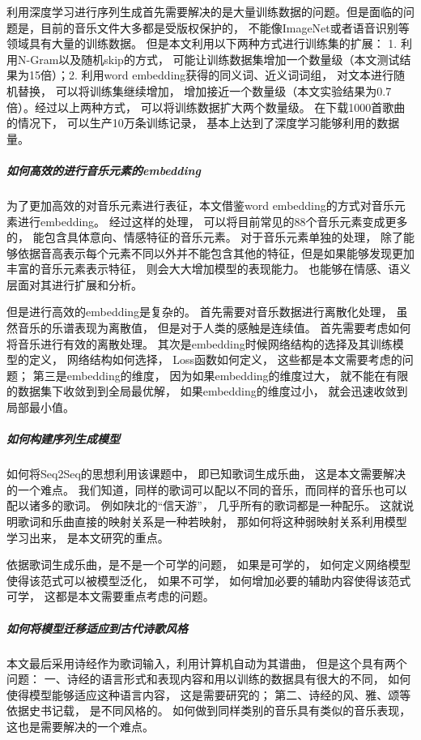 利用深度学习进行序列生成首先需要解决的是大量训练数据的问题。但是面临的问题是，目前的音乐文件大多都是受版权保护的， 不能像ImageNet或者语音识别等领域具有大量的训练数据。 但是本文利用以下两种方式进行训练集的扩展： 1. 利用N-Gram以及随机skip的方式， 可能让训练数据集增加一个数量级（本文测试结果为15倍）；2. 利用word embedding获得的同义词、近义词词组， 对文本进行随机替换， 可以将训练集继续增加， 增加接近一个数量级（本文实验结果为0.7倍）。经过以上两种方式， 可以将训练数据扩大两个数量级。 在下载1000首歌曲的情况下， 可以生产10万条训练记录， 基本上达到了深度学习能够利用的数据量。   

\subparagraph{如何高效的进行音乐元素的embedding}

为了更加高效的对音乐元素进行表征，本文借鉴word embedding的方式对音乐元素进行embedding。 经过这样的处理， 可以将目前常见的88个音乐元素变成更多的， 能包含具体意向、情感特征的音乐元素。 对于音乐元素单独的处理， 除了能够依据音高表示每个元素不同以外并不能包含其他的特征，但是如果能够发现更加丰富的音乐元素表示特征， 则会大大增加模型的表现能力。 也能够在情感、语义层面对其进行扩展和分析。 

但是进行高效的embedding是复杂的。 首先需要对音乐数据进行离散化处理， 虽然音乐的乐谱表现为离散值， 但是对于人类的感触是连续值。 首先需要考虑如何将音乐进行有效的离散处理。 其次是embedding时候网络结构的选择及其训练模型的定义， 网络结构如何选择， Loss函数如何定义， 这些都是本文需要考虑的问题； 第三是embedding的维度， 因为如果embedding的维度过大， 就不能在有限的数据集下收敛到到全局最优解， 如果embedding的维度过小， 就会迅速收敛到局部最小值。


\subparagraph{如何构建序列生成模型}

如何将Seq2Seq的思想利用该课题中， 即已知歌词生成乐曲， 这是本文需要解决的一个难点。 我们知道，同样的歌词可以配以不同的音乐，而同样的音乐也可以配以诸多的歌词。 例如陕北的“信天游”， 几乎所有的歌词都是一种配乐。 这就说明歌词和乐曲直接的映射关系是一种若映射， 那如何将这种弱映射关系利用模型学习出来， 是本文研究的重点。 

依据歌词生成乐曲，是不是一个可学的问题， 如果是可学的， 如何定义网络模型使得该范式可以被模型泛化， 如果不可学， 如何增加必要的辅助内容使得该范式可学， 这都是本文需要重点考虑的问题。 


\subparagraph{如何将模型迁移适应到古代诗歌风格}

本文最后采用诗经作为歌词输入，利用计算机自动为其谱曲， 但是这个具有两个问题： 一、诗经的语言形式和表现内容和用以训练的数据具有很大的不同， 如何使得模型能够适应这种语言内容， 这是需要研究的； 第二、诗经的风、雅、颂等依据史书记载， 是不同风格的。 如何做到同样类别的音乐具有类似的音乐表现， 这也是需要解决的一个难点。 

